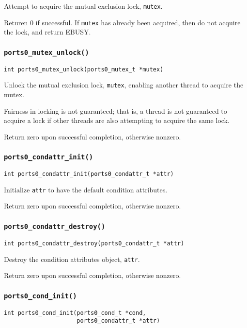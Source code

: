 Attempt to acquire the mutual exclusion lock, {\tt mutex}. 

Returen 0 if successful.  If {\tt mutex} has already been acquired,
then do not acquire the lock, and return EBUSY.


\subsubsection{\tt ports0\_mutex\_unlock()}
\begin{verbatim}
int ports0_mutex_unlock(ports0_mutex_t *mutex)
\end{verbatim}

Unlock the mutual exclusion lock, {\tt mutex}, enabling another thread
to acquire the mutex. 

Fairness in locking is not guaranteed; that is, a thread is not
guaranteed to acquire a lock if other threads are also attempting to
acquire the same lock.

Return zero upon successful completion, otherwise nonzero.


\subsubsection{\tt ports0\_condattr\_init()}
\begin{verbatim}
int ports0_condattr_init(ports0_condattr_t *attr)
\end{verbatim}

Initialize {\tt attr} to have the default condition attributes.

Return zero upon successful completion, otherwise nonzero.


\subsubsection{\tt ports0\_condattr\_destroy()}
\begin{verbatim}
int ports0_condattr_destroy(ports0_condattr_t *attr)
\end{verbatim}

Destroy the condition attributes object, {\tt attr}.

Return zero upon successful completion, otherwise nonzero.


\subsubsection{\tt ports0\_cond\_init()}
\begin{verbatim}
int ports0_cond_init(ports0_cond_t *cond,
                     ports0_condattr_t *attr)
\end{verbatim}

